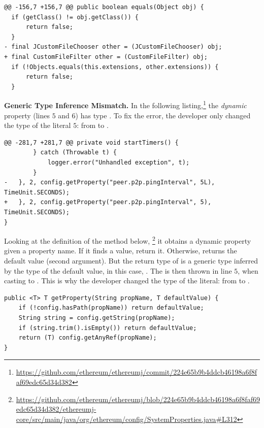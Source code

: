 \begin{lstlisting}[style=java]
@@ -156,7 +156,7 @@ public boolean equals(Object obj) {
  if (getClass() != obj.getClass()) {
      return false;
  }
- final JCustomFileChooser other = (JCustomFileChooser) obj;
+ final CustomFileFilter other = (CustomFileFilter) obj;
  if (!Objects.equals(this.extensions, other.extensions)) {
      return false;
  }
\end{lstlisting}

\textbf{Generic Type Inference Mismatch.}
In the following listing,\footnote{\url{https://github.com/ethereum/ethereumj/commit/224e65b9b4ddcb46198a6f8faf69edc65d34d382}}
the \emph{dynamic} property  (lines $5$ and $6$) has type .
To fix the error, the developer only changed the type of the literal $5$: from  to .

\begin{lstlisting}[style=java]
@@ -281,7 +281,7 @@ private void startTimers() {
        } catch (Throwable t) {
            logger.error("Unhandled exception", t);
        }
-   }, 2, config.getProperty("peer.p2p.pingInterval", 5L), TimeUnit.SECONDS);
+   }, 2, config.getProperty("peer.p2p.pingInterval", 5), TimeUnit.SECONDS);
}
\end{lstlisting}

Looking at the definition of the  method below,%
\footnote{\url{https://github.com/ethereum/ethereumj/blob/224e65b9b4ddcb46198a6f8faf69edc65d34d382/ethereumj-core/src/main/java/org/ethereum/config/SystemProperties.java\#L312}}
it obtains a dynamic property given a property name.
If it finds a value, return it.
Otherwise, returns the default value (second argument).
But the return type of 
is a generic type inferred by the type of the default value, in this case, .
The  is then thrown in line $5$, when casting  to .
This is why the developer changed the type of the literal: from  to .


\begin{lstlisting}[style=java]
public <T> T getProperty(String propName, T defaultValue) {
    if (!config.hasPath(propName)) return defaultValue;
    String string = config.getString(propName);
    if (string.trim().isEmpty()) return defaultValue;
    return (T) config.getAnyRef(propName);
}
\end{lstlisting}


